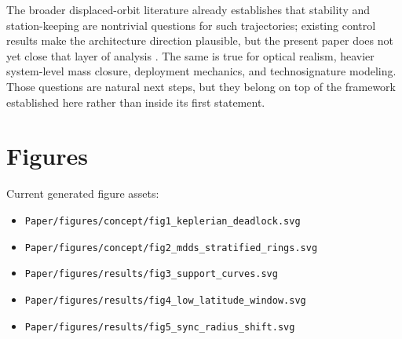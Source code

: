 \documentclass[11pt]{article}
\begin{document}
The broader displaced-orbit literature already establishes that stability and station-keeping
are nontrivial questions for such trajectories; existing control results make the architecture
direction plausible, but the present paper does not yet close that layer of analysis
\cite{mcinnes1998dnko,bookless2006thesis,dachwald2005degradation}. The same is true for
optical realism, heavier system-level mass closure, deployment mechanics, and technosignature
modeling. Those questions are natural next steps, but they belong on top of the framework
established here rather than inside its first statement.

\section{Figures}

Current generated figure assets:
\begin{itemize}[leftmargin=1.5em]
  \item \texttt{Paper/figures/concept/fig1\_keplerian\_deadlock.svg}
  \item \texttt{Paper/figures/concept/fig2\_mdds\_stratified\_rings.svg}
  \item \texttt{Paper/figures/results/fig3\_support\_curves.svg}
  \item \texttt{Paper/figures/results/fig4\_low\_latitude\_window.svg}
  \item \texttt{Paper/figures/results/fig5\_sync\_radius\_shift.svg}
\end{itemize}



\end{document}
